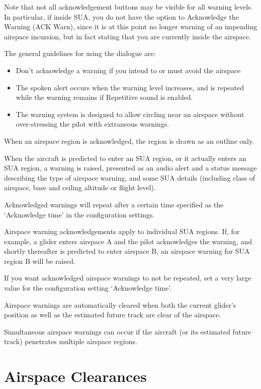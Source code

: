 Note that not all acknowledgement buttons may be visible for all
warning levels.  In particular, if inside SUA, you do not have the
option to Acknowledge the Warning (ACK Warn), since it is at this
point no longer warning of an impending airspace incursion, but in
fact stating that you are currently inside the airspace.

The general guidelines for using the dialogue are:
\begin{itemize}
\item  Don't acknowledge a warning if you intend to or must avoid the airspace
\item  The spoken alert occurs when the warning level increases, and is
  repeated while the warning remains if Repetitive sound is enabled.
\item  The warning system is designed to allow circling near an airspace without
  over-stressing the pilot with extraneous warnings.
\end{itemize}

When an airspace region is acknowledged, the region is drawn as an
outline only.

When the aircraft is predicted to enter an SUA region, or it actually
enters an SUA region, a warning is raised, presented as an audio alert
and a status message describing the type of airspace warning, and some SUA
details (including class of airspace, base and ceiling altitude or
flight level).

Acknowledged warnings will repeat after a certain time specified as
the `Acknowledge time' in the configuration settings.

Airspace warning acknowledgements apply to individual SUA regions.
If, for example, a glider enters airspace A and the pilot acknowledges
the warning, and shortly thereafter is predicted to enter airspace B,
an airspace warning for SUA region B will be raised.

\tip If you want acknowledged airspace warnings to not be repeated,
set a very large value for the configuration setting `Acknowledge
time'.

Airspace warnings are automatically cleared when both the current
glider's position as well as the estimated future track are clear
of the airspace.

Simultaneous airspace warnings can occur if the aircraft (or its
estimated future track) penetrates multiple airspace regions.

\section{Airspace Clearances}\label{sec:airspace-clearances}

